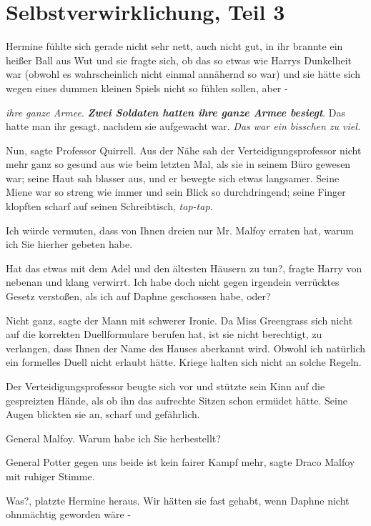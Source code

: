 \chapter{Selbstverwirklichung, Teil 3}

Hermine fühlte sich gerade nicht sehr nett, auch nicht gut, in ihr brannte ein
heißer Ball aus Wut und sie fragte sich, ob das so etwas wie Harrys Dunkelheit
war (obwohl es wahrscheinlich nicht einmal annähernd so war) und sie hätte sich
wegen eines dummen kleinen Spiels nicht so fühlen sollen, aber -

\emph{ihre ganze Armee}. \textbf{\emph{Zwei Soldaten hatten ihre ganze Armee
besiegt}}. Das hatte man ihr gesagt, nachdem sie aufgewacht war. \emph{Das war
ein bisschen zu viel.}

\glqq{}Nun\grqq{}, sagte Professor Quirrell. Aus der Nähe sah der
Verteidigungsprofessor nicht mehr ganz so gesund aus wie beim letzten Mal, als
sie in seinem Büro gewesen war; seine Haut sah blasser aus, und er bewegte sich
etwas langsamer. Seine Miene war so streng wie immer und sein Blick so
durchdringend; seine Finger klopften scharf auf seinen Schreibtisch,
\emph{tap-tap.}

\glqq{}Ich würde vermuten, dass von Ihnen dreien nur Mr. Malfoy erraten hat,
warum ich Sie hierher gebeten habe.\grqq{}

\glqq{}Hat das etwas mit dem Adel und den ältesten Häusern zu tun?\grqq{}, fragte
Harry von nebenan und klang verwirrt. \glqq{}Ich habe doch nicht gegen irgendein
verrücktes Gesetz verstoßen, als ich auf Daphne geschossen habe, oder?\grqq{}

\glqq{}Nicht ganz\grqq{}, sagte der Mann mit schwerer Ironie. \glqq{}Da Miss
Greengrass sich nicht auf die korrekten Duellformulare berufen hat, ist sie
nicht berechtigt, zu verlangen, dass Ihnen der Name des Hauses aberkannt wird.
Obwohl ich natürlich ein formelles Duell nicht erlaubt hätte. Kriege halten sich
nicht an solche Regeln.\grqq{}

Der Verteidigungsprofessor beugte sich vor und stützte sein Kinn auf die
gespreizten Hände, als ob ihn das aufrechte Sitzen schon ermüdet hätte. Seine
Augen blickten sie an, scharf und gefährlich.

\glqq{}General Malfoy. Warum habe ich Sie herbestellt?\grqq{}

\glqq{}General Potter gegen uns beide ist kein fairer Kampf mehr\grqq{}, sagte
Draco Malfoy mit ruhiger Stimme.

\glqq{}Was?\grqq{}, platzte Hermine heraus. \glqq{}Wir hätten sie fast gehabt,
wenn Daphne nicht ohnmächtig geworden wäre -\grqq{}

